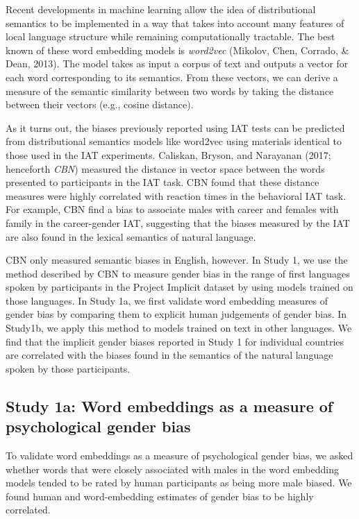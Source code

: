 \documentclass[man,floatsintext]{apa6}
\theoremstyle{definition}
\theoremstyle{definition}
\theoremstyle{definition}
\theoremstyle{remark}
\begin{document}
Recent developments in machine learning allow the idea of distributional
semantics to be implemented in a way that takes into account many
features of local language structure while remaining computationally
tractable. The best known of these word embedding models is
\emph{word2vec} (Mikolov, Chen, Corrado, \& Dean, 2013). The model takes
as input a corpus of text and outputs a vector for each word
corresponding to its semantics. From these vectors, we can derive a
measure of the semantic similarity between two words by taking the
distance between their vectors (e.g., cosine distance).

As it turns out, the biases previously reported using IAT tests can be
predicted from distributional semantics models like word2vec using
materials identical to those used in the IAT experiments. Caliskan,
Bryson, and Narayanan (2017; henceforth \emph{CBN}) measured the
distance in vector space between the words presented to participants in
the IAT task. CBN found that these distance measures were highly
correlated with reaction times in the behavioral IAT task. For example,
CBN find a bias to associate males with career and females with family
in the career-gender IAT, suggesting that the biases measured by the IAT
are also found in the lexical semantics of natural language.

CBN only measured semantic biases in English, however. In Study 1, we
use the method described by CBN to measure gender bias in the range of
first languages spoken by participants in the Project Implicit dataset
by using models trained on those languages. In Study 1a, we first
validate word embedding measures of gender bias by comparing them to
explicit human judgements of gender bias. In Study1b, we apply this
method to models trained on text in other languages. We find that the
implicit gender biases reported in Study 1 for individual countries are
correlated with the biases found in the semantics of the natural
language spoken by those participants.

\subsection{Study 1a: Word embeddings as a measure of psychological
gender
bias}\label{study-1a-word-embeddings-as-a-measure-of-psychological-gender-bias}

To validate word embeddings as a measure of psychological gender bias,
we asked whether words that were closely associated with males in the
word embedding models tended to be rated by human participants as being
more male biased. We found human and word-embedding estimates of gender
bias to be highly correlated.
\end{document}
